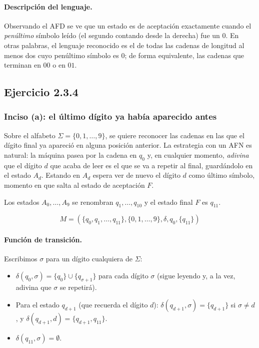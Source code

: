 \documentclass[12pt]{article}
\begin{document}
\paragraph{Descripción del lenguaje.} Observando el AFD se ve que un estado es de aceptación exactamente cuando el \emph{penúltimo} símbolo leído (el segundo contando desde la derecha) fue un $0$. En otras palabras, el lenguaje reconocido es el de todas las cadenas de longitud al menos dos cuyo penúltimo símbolo es $0$; de forma equivalente, las cadenas que terminan en $00$ o en $01$.


\subsection{Ejercicio 2.3.4}

\subsubsection{Inciso (a): el último dígito ya había aparecido antes}

Sobre el alfabeto $\Sigma=\{0,1,\dots,9\}$, se quiere reconocer las cadenas en las que el dígito final ya apareció en alguna posición anterior. La estrategia con un AFN es natural: la máquina pasea por la cadena en $q_0$ y, en cualquier momento, \emph{adivina} que el dígito $d$ que acaba de leer es el que se va a repetir al final, guardándolo en el estado $A_d$. Estando en $A_d$ espera ver de nuevo el dígito $d$ como último símbolo, momento en que salta al estado de aceptación $F$.

Los estados $A_0,\dots,A_9$ se renombran $q_1,\dots,q_{10}$ y el estado final $F$ es $q_{11}$.

\[
M=(\{q_0,q_1,\dots,q_{11}\},\{0,1,\dots,9\},\delta,q_0,\{q_{11}\})
\]

\paragraph{Función de transición.} Escribimos $\sigma$ para un dígito cualquiera de $\Sigma$:
\begin{itemize}
  \item $\delta(q_0,\sigma)=\{q_0\}\cup\{q_{\sigma+1}\}$ para cada dígito $\sigma$ (sigue leyendo y, a la vez, adivina que $\sigma$ se repetirá).
  \item Para el estado $q_{d+1}$ (que recuerda el dígito $d$): $\delta(q_{d+1},\sigma)=\{q_{d+1}\}$ si $\sigma\neq d$, y $\delta(q_{d+1},d)=\{q_{d+1},q_{11}\}$.
  \item $\delta(q_{11},\sigma)=\emptyset$.
\end{itemize}
\end{document}
